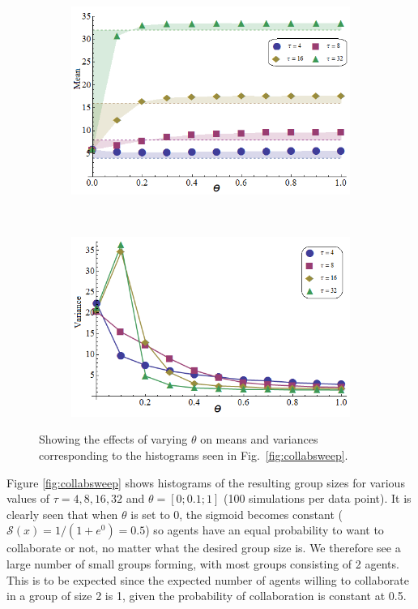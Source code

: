 \documentclass{TeXstyles/DARS/svmult}  %
\newcommand{\sig}{\mathcal{S}}
\begin{document}
\begin{figure}[!htb]
\begin{subfigure}{0.5\textwidth}
\centering\includegraphics[width=1.0\textwidth]{figures/means.png}
\centering\caption{}\label{fig:means}
\end{subfigure}~
\begin{subfigure}{0.5\textwidth}
\centering\includegraphics[width=1.0\textwidth]{figures/variances.png}
\centering\caption{}\label{fig:vars}
\end{subfigure}
\caption{Showing the effects of varying $\theta$ on means and variances corresponding to the histograms seen in Fig.~\ref{fig:collabsweep}.}\label{fig:meansvars}
\end{figure}

Figure \ref{fig:collabsweep} shows histograms of the resulting group sizes for various values of $\tau=4, 8, 16, 32$ and $\theta=[0;0.1;1]$ (100 simulations per data point). It is clearly seen that when $\theta$ is set to 0, the sigmoid becomes constant ($\sig(x) = 1/(1 + e^{0}) = 0.5$) so agents have an equal probability to want to collaborate or not, no matter what the desired group size is. We therefore see a large number of small groups forming, with most groups consisting of 2 agents. This is to be expected since the expected number of agents willing to collaborate in a group of size 2 is 1, given the probability of collaboration is constant at 0.5.
\end{document}
